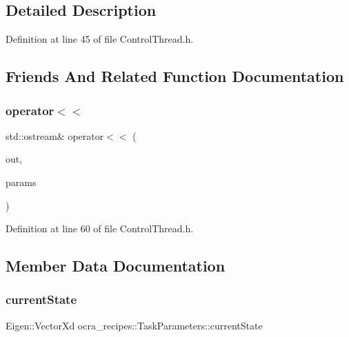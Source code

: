 \subsection{Detailed Description}


Definition at line 45 of file Control\+Thread.\+h.



\subsection{Friends And Related Function Documentation}
\hypertarget{classocra__recipes_1_1TaskParameters_a8efa666207faa3291d83472bfee94a08}{}\label{classocra__recipes_1_1TaskParameters_a8efa666207faa3291d83472bfee94a08} 
\subsubsection{\texorpdfstring{operator$<$$<$}{operator<<}}
{\footnotesize\ttfamily std\+::ostream\& operator$<$$<$ (\begin{DoxyParamCaption}\item[{std\+::ostream \&}]{out,  }\item[{const \hyperlink{classocra__recipes_1_1TaskParameters}{Task\+Parameters} \&}]{params }\end{DoxyParamCaption})\hspace{0.3cm}{\ttfamily [friend]}}



Definition at line 60 of file Control\+Thread.\+h.



\subsection{Member Data Documentation}
\hypertarget{classocra__recipes_1_1TaskParameters_a323bf15f03055fcbf07f865ba9074381}{}\label{classocra__recipes_1_1TaskParameters_a323bf15f03055fcbf07f865ba9074381} 
\subsubsection{\texorpdfstring{current\+State}{currentState}}
{\footnotesize\ttfamily Eigen\+::\+Vector\+Xd ocra\+\_\+recipes\+::\+Task\+Parameters\+::current\+State}



